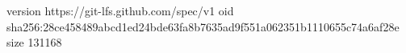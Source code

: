 version https://git-lfs.github.com/spec/v1
oid sha256:28ce458489abcd1ed24bde63fa8b7635ad9f551a062351b1110655c74a6af28e
size 131168
